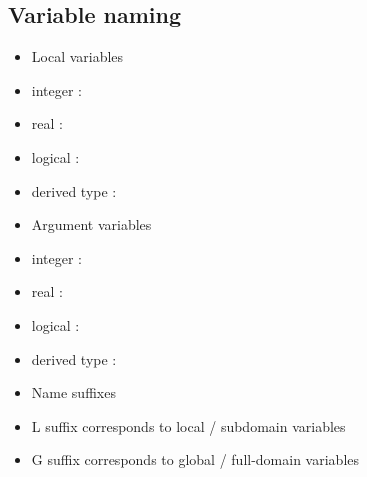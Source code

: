 \documentclass[letterpaper,10pt,english]{sphinxmanual}
\begin{document}
\subsection{Variable naming}
\label{\detokenize{rules/I1:variable-naming}}\begin{itemize}
\item {} 
Local variables

\end{itemize}
\begin{itemize}
\item {} 
integer : 

\item {} 
real : 

\item {} 
logical : 

\item {} 
derived type : 

\end{itemize}
\begin{itemize}
\item {} 
Argument variables

\end{itemize}
\begin{itemize}
\item {} 
integer : 

\item {} 
real : 

\item {} 
logical : 

\item {} 
derived type : 

\end{itemize}
\begin{itemize}
\item {} 
Name suffixes

\end{itemize}
\begin{itemize}
\item {} 
L suffix corresponds to local / subdomain variables

\item {} 
G suffix corresponds to global / full-domain variables

\end{itemize}
\end{document}
